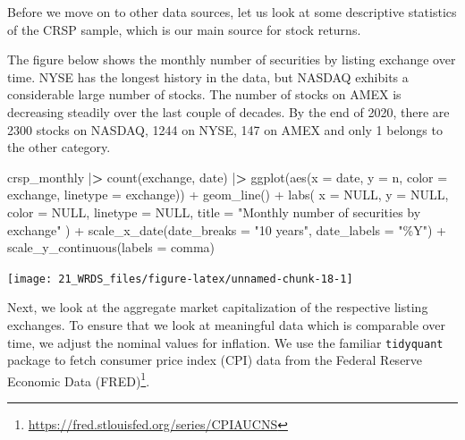 \documentclass[
]{book}
\newenvironment{Shaded}{\begin{snugshade}}{\end{snugshade}}
\newcommand{\AttributeTok}[1]{\textcolor[rgb]{0.61,0.61,0.61}{#1}}
\newcommand{\ConstantTok}[1]{\textcolor[rgb]{0,0,0}{#1}}
\newcommand{\ErrorTok}[1]{\textcolor[rgb]{0.14,0.14,0.14}{\textbf{#1}}}
\newcommand{\FunctionTok}[1]{\textcolor[rgb]{0,0,0}{#1}}
\newcommand{\NormalTok}[1]{#1}
\newcommand{\SpecialCharTok}[1]{\textcolor[rgb]{0,0,0}{#1}}
\newcommand{\StringTok}[1]{\textcolor[rgb]{0.5,0.5,0.5}{#1}}
\renewcommand{\href}[2]{#2\footnote{\url{#1}}}
\begin{document}
Before we move on to other data sources, let us look at some descriptive statistics of the CRSP sample, which is our main source for stock returns.

The figure below shows the monthly number of securities by listing exchange over time. NYSE has the longest history in the data, but NASDAQ exhibits a considerable large number of stocks. The number of stocks on AMEX is decreasing steadily over the last couple of decades. By the end of 2020, there are 2300 stocks on NASDAQ, 1244 on NYSE, 147 on AMEX and only 1 belongs to the other category.

\begin{Shaded}
\begin{Highlighting}[]
\NormalTok{crsp\_monthly }\SpecialCharTok{|}\ErrorTok{\textgreater{}}
  \FunctionTok{count}\NormalTok{(exchange, date) }\SpecialCharTok{|}\ErrorTok{\textgreater{}}
  \FunctionTok{ggplot}\NormalTok{(}\FunctionTok{aes}\NormalTok{(}\AttributeTok{x =}\NormalTok{ date, }\AttributeTok{y =}\NormalTok{ n, }\AttributeTok{color =}\NormalTok{ exchange, }\AttributeTok{linetype =}\NormalTok{ exchange)) }\SpecialCharTok{+}
  \FunctionTok{geom\_line}\NormalTok{() }\SpecialCharTok{+}
  \FunctionTok{labs}\NormalTok{(}
    \AttributeTok{x =} \ConstantTok{NULL}\NormalTok{, }\AttributeTok{y =} \ConstantTok{NULL}\NormalTok{, }\AttributeTok{color =} \ConstantTok{NULL}\NormalTok{, }\AttributeTok{linetype =} \ConstantTok{NULL}\NormalTok{,}
    \AttributeTok{title =} \StringTok{"Monthly number of securities by exchange"}
\NormalTok{  ) }\SpecialCharTok{+}
  \FunctionTok{scale\_x\_date}\NormalTok{(}\AttributeTok{date\_breaks =} \StringTok{"10 years"}\NormalTok{, }\AttributeTok{date\_labels =} \StringTok{"\%Y"}\NormalTok{) }\SpecialCharTok{+}
  \FunctionTok{scale\_y\_continuous}\NormalTok{(}\AttributeTok{labels =}\NormalTok{ comma)}
\end{Highlighting}
\end{Shaded}

\begin{center}\texttt{[image: 21\_WRDS\_files/figure-latex/unnamed-chunk-18-1]} \end{center}

Next, we look at the aggregate market capitalization of the respective listing exchanges. To ensure that we look at meaningful data which is comparable over time, we adjust the nominal values for inflation. We use the familiar \texttt{tidyquant} package to fetch consumer price index (CPI) data from the \href{https://fred.stlouisfed.org/series/CPIAUCNS}{Federal Reserve Economic Data (FRED)}.
\end{document}
